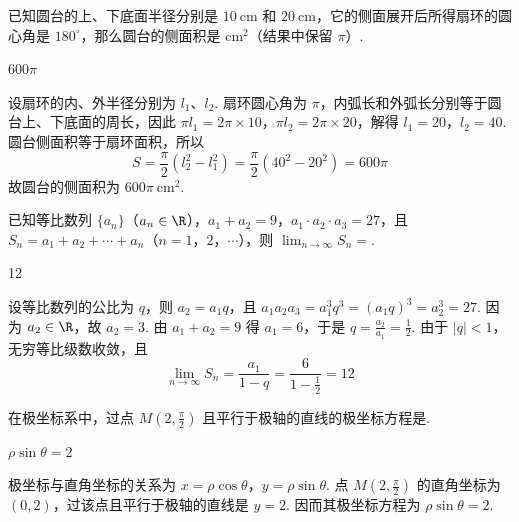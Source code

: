 \documentclass[UTF8,a4paper,oneside,11pt]{ctexbook}
\begin{document}
\begin{problem}
已知圆台的上、下底面半径分别是 \(10 \mathrm{~cm}\) 和 \(20 \mathrm{~cm}\)，它的侧面展开后所得扇环的圆心角是 \(180^{\circ}\)，那么圆台的侧面积是\fillinblank{} \(\mathrm{cm}^{2}\)（结果中保留 \(\pi\)）.
\end{problem}

\begin{answer}
\(600\pi\)
\end{answer}

\begin{solution}
设扇环的内、外半径分别为 \(l_1\)、\(l_2\). 扇环圆心角为 \(\pi\)，内弧长和外弧长分别等于圆台上、下底面的周长，因此
\(\pi l_1=2\pi\times 10\)，\(\pi l_2=2\pi\times 20\)，解得 \(l_1=20\)，\(l_2=40\). 圆台侧面积等于扇环面积，所以
\[
S=\frac{\pi}{2}\left(l_2^2-l_1^2\right)=\frac{\pi}{2}\left(40^2-20^2\right)=600\pi
\]
故圆台的侧面积为 \(600\pi\ \mathrm{cm}^{2}\).
\end{solution}

\begin{problem}
已知等比数列 \(\{a_n\}\)（\(a_n \in \R\)），\(a_1 + a_2 = 9\)，\(a_1 \cdot a_2 \cdot a_3 = 27\)，且 \(S_n = a_1 + a_2 + \cdots + a_n\)（\(n = 1\)，\(2\)，\(\cdots\)），则 \(\displaystyle\lim_{n \to \infty} S_n =\)\fillinblank{}.
\end{problem}

\begin{answer}
12
\end{answer}

\begin{solution}
设等比数列的公比为 \(q\)，则 \(a_2=a_1q\)，且
\(a_1a_2a_3=a_1^3q^3=(a_1q)^3=a_2^3=27\). 因为 \(a_2\in\R\)，故 \(a_2=3\). 由 \(a_1+a_2=9\) 得 \(a_1=6\)，于是 \(q=\frac{a_2}{a_1}=\frac{1}{2}\). 由于 \(|q|<1\)，无穷等比级数收敛，且
\[
\lim_{n\to\infty}S_n=\frac{a_1}{1-q}=\frac{6}{1-\frac{1}{2}}=12
\]
\end{solution}

\begin{problem}
在极坐标系中，过点 \(M\left(2, \frac{\pi}{2}\right)\) 且平行于极轴的直线的极坐标方程是\fillinblank{}.
\end{problem}

\begin{answer}
\(\rho \sin \theta = 2\)
\end{answer}

\begin{solution}
极坐标与直角坐标的关系为 \(x=\rho\cos\theta\)，\(y=\rho\sin\theta\). 点 \(M\left(2,\frac{\pi}{2}\right)\) 的直角坐标为 \((0,2)\)，过该点且平行于极轴的直线是 \(y=2\). 因而其极坐标方程为 \(\rho\sin\theta=2\).
\end{solution}
\end{document}
